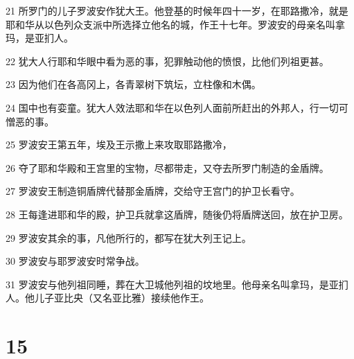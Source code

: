 \par 21 所罗门的儿子罗波安作犹大王。他登基的时候年四十一岁，在耶路撒冷，就是耶和华从以色列众支派中所选择立他名的城，作王十七年。罗波安的母亲名叫拿玛，是亚扪人。
\par 22 犹大人行耶和华眼中看为恶的事，犯罪触动他的愤恨，比他们列祖更甚。
\par 23 因为他们在各高冈上，各青翠树下筑坛，立柱像和木偶。
\par 24 国中也有娈童。犹大人效法耶和华在以色列人面前所赶出的外邦人，行一切可憎恶的事。
\par 25 罗波安王第五年，埃及王示撒上来攻取耶路撒冷，
\par 26 夺了耶和华殿和王宫里的宝物，尽都带走，又夺去所罗门制造的金盾牌。
\par 27 罗波安王制造铜盾牌代替那金盾牌，交给守王宫门的护卫长看守。
\par 28 王每逢进耶和华的殿，护卫兵就拿这盾牌，随後仍将盾牌送回，放在护卫房。
\par 29 罗波安其余的事，凡他所行的，都写在犹大列王记上。
\par 30 罗波安与耶罗波安时常争战。
\par 31 罗波安与他列祖同睡，葬在大卫城他列祖的坟地里。他母亲名叫拿玛，是亚扪人。他儿子亚比央（又名亚比雅）接续他作王。

\chapter{15}

